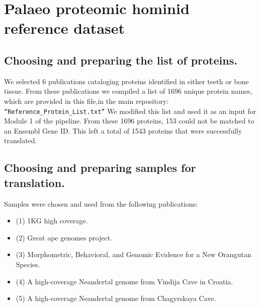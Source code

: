 \documentclass{book}
\begin{document}
\clearpage















\section{\Large Palaeo proteomic hominid reference dataset}

\subsection{\large Choosing and preparing the list of proteins.}

We selected 6 publications cataloging proteins identified in either teeth or bone tissue\cite{castiblanco2015identification,alves2011unraveling,acil2005detection,salmon2016global,jagr2012comprehensive,park2009proteomics}. From these publications we compiled a list of 1696 unique protein names, which are provided in this file,in the main repository:
\verb|“Reference_Protein_List.txt”|
We modified this list and used it as an input for Module 1 of the pipeline. From these 1696 proteins, 153 could not be matched to an Ensembl Gene ID. This left a total of 1543 proteins that were successfully translated. 

\vspace{1.2}

\subsection{\large Choosing and preparing samples for translation.}

Samples were chosen and used from the following publications:
\begin{itemize}
\item (1) 1KG high coverage\cite{byrskahigh}. 
\item (2) Great ape genomes project\cite{prado2013great}. 
\item (3) Morphometric, Behavioral, and Genomic Evidence for a New Orangutan Species\cite{nater2017morphometric}. 
\item (4) A high-coverage Neandertal genome from Vindija Cave in Croatia\cite{prufer2017high}. 
\item (5) A high-coverage Neandertal genome from Chagyrskaya Cave\cite{mafessoni2020high}. 
\end{itemize}
\end{document}
